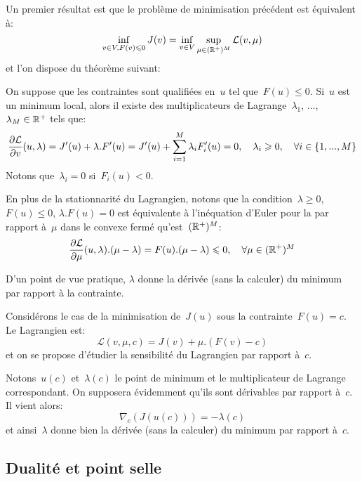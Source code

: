 \medskip
Un premier résultat est que le problème de minimisation précédent est équivalent à:
\begin{equation}
\inf_{v\in V, F(v)\leqslant0} J(v) = \inf_{v\in V} \sup_{\mu\in(\mathbb R^+)^M} \mathcal{L}(v,\mu)
\end{equation}
et l'on dispose du théorème suivant:
\begin{theoreme}
On suppose que les contraintes sont qualifiées en~$u$ tel que~$F(u)\le0$. Si~$u$ est un minimum local, alors il existe des multiplicateurs de Lagrange~$\lambda_1$, ..., $\lambda_M\in\mathbb R^+$ tels que:
\begin{equation}
\dfrac{\partial\mathcal{L}}{\partial v}(u,\lambda) = J'(u)+\lambda.F'(u)
= J'(u)+\displaystyle\sum_{i=1}^M\lambda_iF_i'(u) =0, \quad \lambda_i\geqslant0, 
\quad \forall i\in\{1, ..., M\}
\end{equation}
Notons que~$\lambda_i=0$ si~$F_i(u)<0$.

En plus de la stationnarité du Lagrangien, notons que la condition~$\lambda\ge0$, $F(u)\le 0$, $\lambda.F(u)=0$ est équivalente à l'inéquation d'Euler pour la  par rapport à~$\mu$ dans le convexe fermé qu'est~$(\mathbb R^+)^M$:
\begin{equation}
\dfrac{\partial\mathcal{L}}{\partial \mu}(u,\lambda).(\mu-\lambda)=F(u).(\mu-\lambda)\leqslant0, \quad \forall\mu\in(\mathbb R^+)^M
\end{equation}
\end{theoreme}

D'un point de vue pratique, $\lambda$ donne la dérivée (sans la calculer) du minimum par rapport à la contrainte.
\begin{demonstration}%
Considérons le cas de la minimisation de~$J(u)$ sous la contrainte~$F(u)=c$.
Le Lagrangien est:
\[ \mathcal{L}(v,\mu,c)=J(v)+\mu.(F(v)-c) \]
et on se propose d'étudier la sensibilité du Lagrangien par rapport à~$c$.

Notons~$u(c)$ et~$\lambda(c)$ le point de minimum et le multiplicateur de Lagrange correspondant. On supposera évidemment qu'ils sont dérivables par rapport à~$c$. Il vient alors:
\[ \nabla_c\left(J(u(c))\right)=-\lambda(c) \]
et ainsi~$\lambda$ donne bien la dérivée (sans la calculer) du minimum par rapport à~$c$.
\end{demonstration}


\medskip
\subsection{Dualité et point selle}

